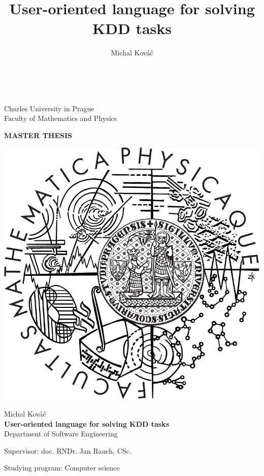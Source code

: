 \documentclass[a4paper,12pt]{book}
\author{Michal Kováč}
\title{User-oriented language for solving KDD tasks}
\begin{document}
\begin{titlepage}
\begin{center}
\ \\

\vspace{15mm}

\large
Charles University in Prague\\
Faculty of Mathematics and Physics\\

\vspace{5mm}

{\Large\bf MASTER THESIS}

\vspace{10mm}

\includegraphics[scale=0.5]{logo}

\vspace{15mm}

{\Large Michal Kováč}\\
\vspace{5mm}
{\Large\bf User-oriented language for solving KDD tasks}\\
\vspace{5mm}
Department of Software Engineering
\vspace{15mm}

\large
\noindent Supervisor: doc. RNDr. Jan Rauch, CSc.
\vspace{1mm}

\noindent Studying program: Computer science
\end{center}
\end{titlepage} %
\end{document}
